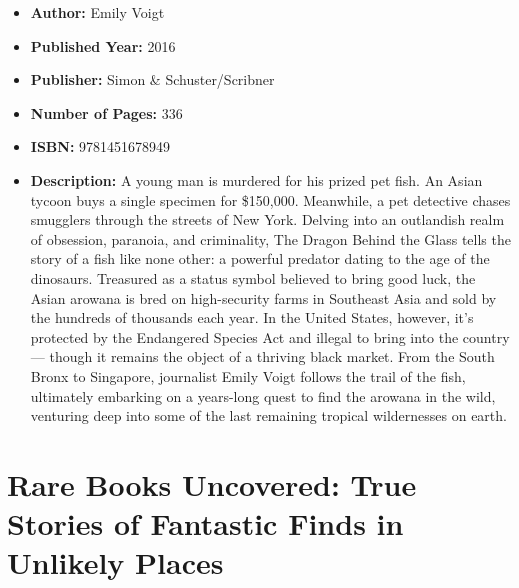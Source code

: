 \documentclass{tufte-handout}
\begin{document}
\begin{itemize}
    \item[] \textbf{Author:} Emily Voigt
    \item[] \textbf{Published Year:} 2016
    \item[] \textbf{Publisher:} Simon \& Schuster/Scribner
    \item[] \textbf{Number of Pages:} 336   
    \item[] \textbf{ISBN:} 9781451678949
    \item[] \textbf{Description:} A young man is murdered for his prized pet fish. An Asian tycoon buys a single specimen for \$150,000. Meanwhile, a pet detective chases smugglers through the streets of New York. Delving into an outlandish realm of obsession, paranoia, and criminality, The Dragon Behind the Glass tells the story of a fish like none other: a powerful predator dating to the age of the dinosaurs. Treasured as a status symbol believed to bring good luck, the Asian arowana is bred on high-security farms in Southeast Asia and sold by the hundreds of thousands each year. In the United States, however, it’s protected by the Endangered Species Act and illegal to bring into the country --- though it remains the object of a thriving black market. From the South Bronx to Singapore, journalist Emily Voigt follows the trail of the fish, ultimately embarking on a years-long quest to find the arowana in the wild, venturing deep into some of the last remaining tropical wildernesses on earth.
\end{itemize}

\section*{Rare Books Uncovered: True Stories of Fantastic Finds in Unlikely Places}
\end{document}
